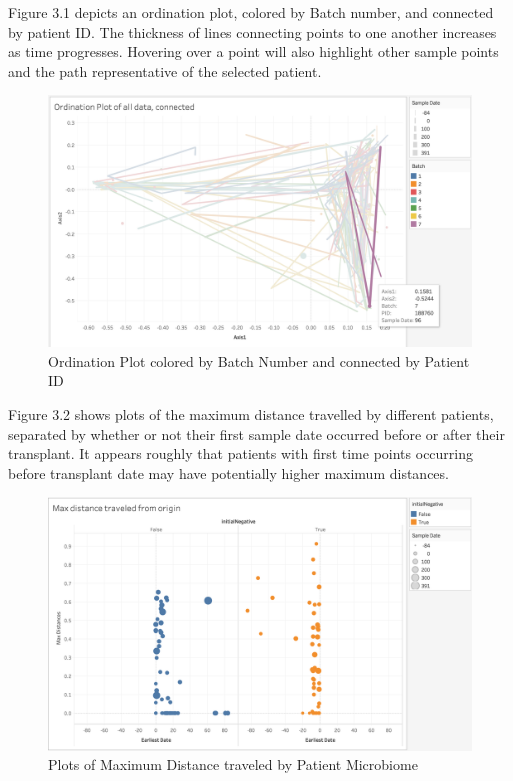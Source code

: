 \documentclass[12pt,twoside]{dukestatscithesis}
\begin{document}
Figure 3.1 depicts an ordination plot, colored by Batch number, and
connected by patient ID. The thickness of lines connecting points to one
another increases as time progresses. Hovering over a point will also
highlight other sample points and the path representative of the
selected patient.
\begin{figure}
\includegraphics[width=700px]{figure/figure8} \caption{Ordination Plot colored by Batch Number and connected by Patient ID}\label{fig:figure8}
\end{figure}
Figure 3.2 shows plots of the maximum distance travelled by different
patients, separated by whether or not their first sample date occurred
before or after their transplant. It appears roughly that patients with
first time points occurring before transplant date may have potentially
higher maximum distances.
\begin{figure}
\includegraphics[width=700px]{figure/figure9} \caption{Plots of Maximum Distance traveled by Patient Microbiome}\label{fig:figure9}
\end{figure}
\end{document}
